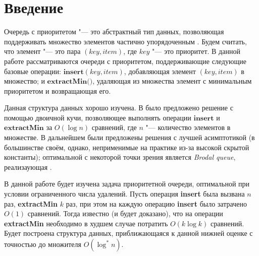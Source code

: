 \chapter*{Введение}							%



Очередь с приоритетом "--- это абстрактный тип данных, позволяющая поддерживать
множество элементов частично упорядоченным \cite{Cormen}. Будем считать, что элемент "---
это пара $(\textit{key}, \textit{item})$, где $key$ "--- это приоритет.
В данной работе рассматриваются очереди с приоритетом, поддерживающие следующие
базовые операции: $\textbf{insert}(key, item)$, добавляющая элемент $(key, item)$
в множество; и $\textbf{extractMin()}$, удаляющая
из множества элемент с минимальным приоритетом и возвращающая его.

Данная структура данных хорошо изучена. В  было предложено решение с помощью двоичной кучи, позволяющее выполнять
операции $\textbf{insert}$ и $\textbf{extractMin}$ за $O(\log n)$ сравнений, где $n$ "---
количество элементов в множестве. В дальнейшем были предложены решения с лучшей
асимптотикой (в большинстве своём, однако, неприменимые на практике из-за высокой
скрытой константы); оптимальной с некоторой точки зрения является 
\emph{Brodal queue}, реализаующая .

В данной работе будет изучена задача приоритетной очереди, оптимальной
при условии ограниченного числа удалений. Пусть операция \textbf{insert}
была вызвана $n$ раз, \textbf{extractMin} $k$ раз, при этом на каждую
операцию \textbf{insert} было затрачено $O(1)$ сравнений. Тогда известно
(и будет доказано), что на операции \textbf{extractMin} необходимо в худшем
случае потратить $O(k \log k)$ сравнений. Будет построена структура
данных, приближающаяся к данной нижней оценке с точностью до
множителя $O(\log^* n)$.



%
